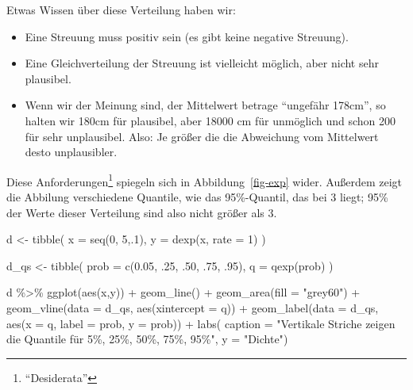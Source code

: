 \documentclass[
  a4paper,
  DIV=11]{scrreprt}
\newenvironment{Shaded}{\begin{snugshade}}{\end{snugshade}}
\newcommand{\AttributeTok}[1]{\textcolor[rgb]{0.40,0.45,0.13}{#1}}
\newcommand{\DecValTok}[1]{\textcolor[rgb]{0.68,0.00,0.00}{#1}}
\newcommand{\FloatTok}[1]{\textcolor[rgb]{0.68,0.00,0.00}{#1}}
\newcommand{\FunctionTok}[1]{\textcolor[rgb]{0.28,0.35,0.67}{#1}}
\newcommand{\NormalTok}[1]{\textcolor[rgb]{0.00,0.23,0.31}{#1}}
\newcommand{\OtherTok}[1]{\textcolor[rgb]{0.00,0.23,0.31}{#1}}
\newcommand{\SpecialCharTok}[1]{\textcolor[rgb]{0.37,0.37,0.37}{#1}}
\newcommand{\StringTok}[1]{\textcolor[rgb]{0.13,0.47,0.30}{#1}}
\providecommand{\tightlist}{%
  \setlength{\itemsep}{0pt}\setlength{\parskip}{0pt}}\usepackage{longtable,booktabs,array}
\theoremstyle{definition}
\theoremstyle{remark}
\begin{document}
Etwas Wissen über diese Verteilung haben wir:

\begin{itemize}
\tightlist
\item
  Eine Streuung muss positiv sein (es gibt keine negative Streuung).
\item
  Eine Gleichverteilung der Streuung ist vielleicht möglich, aber nicht
  sehr plausibel.
\item
  Wenn wir der Meinung sind, der Mittelwert betrage ``ungefähr 178cm'',
  so halten wir 180cm für plausibel, aber 18000 cm für unmöglich und
  schon 200 für sehr unplausibel. Also: Je größer die die Abweichung vom
  Mittelwert desto unplausibler.
\end{itemize}

Diese Anforderungen\footnote{``Desiderata''} spiegeln sich in
Abbildung~\ref{fig-exp} wider. Außerdem zeigt die Abbilung verschiedene
Quantile, wie das 95\%-Quantil, das bei 3 liegt; 95\% der Werte dieser
Verteilung sind also nicht größer als 3.

\begin{Shaded}
\begin{Highlighting}[]
\NormalTok{d }\OtherTok{\textless{}{-}}
  \FunctionTok{tibble}\NormalTok{(}
    \AttributeTok{x =} \FunctionTok{seq}\NormalTok{(}\DecValTok{0}\NormalTok{, }\DecValTok{5}\NormalTok{,.}\DecValTok{1}\NormalTok{),}
    \AttributeTok{y =} \FunctionTok{dexp}\NormalTok{(x, }\AttributeTok{rate =} \DecValTok{1}\NormalTok{)}
\NormalTok{  )}


\NormalTok{d\_qs }\OtherTok{\textless{}{-}}
  \FunctionTok{tibble}\NormalTok{(}
    \AttributeTok{prob =} \FunctionTok{c}\NormalTok{(}\FloatTok{0.05}\NormalTok{, .}\DecValTok{25}\NormalTok{, .}\DecValTok{50}\NormalTok{, .}\DecValTok{75}\NormalTok{, .}\DecValTok{95}\NormalTok{),}
    \AttributeTok{q =} \FunctionTok{qexp}\NormalTok{(prob) }
\NormalTok{  )}

\NormalTok{d }\SpecialCharTok{\%\textgreater{}\%} 
  \FunctionTok{ggplot}\NormalTok{(}\FunctionTok{aes}\NormalTok{(x,y)) }\SpecialCharTok{+}
  \FunctionTok{geom\_line}\NormalTok{() }\SpecialCharTok{+}
  \FunctionTok{geom\_area}\NormalTok{(}\AttributeTok{fill =} \StringTok{"grey60"}\NormalTok{) }\SpecialCharTok{+}
  \FunctionTok{geom\_vline}\NormalTok{(}\AttributeTok{data =}\NormalTok{ d\_qs,}
             \FunctionTok{aes}\NormalTok{(}\AttributeTok{xintercept =}\NormalTok{ q)) }\SpecialCharTok{+}
  \FunctionTok{geom\_label}\NormalTok{(}\AttributeTok{data =}\NormalTok{ d\_qs,}
             \FunctionTok{aes}\NormalTok{(}\AttributeTok{x =}\NormalTok{ q, }
                 \AttributeTok{label =}\NormalTok{ prob,}
                 \AttributeTok{y =}\NormalTok{ prob)) }\SpecialCharTok{+}
  \FunctionTok{labs}\NormalTok{(}
       \AttributeTok{caption =} \StringTok{"Vertikale Striche zeigen die Quantile für 5\%, 25\%, 50\%, 75\%, 95\%"}\NormalTok{,}
       \AttributeTok{y =} \StringTok{"Dichte"}\NormalTok{)}
\end{Highlighting}
\end{Shaded}
\end{document}
